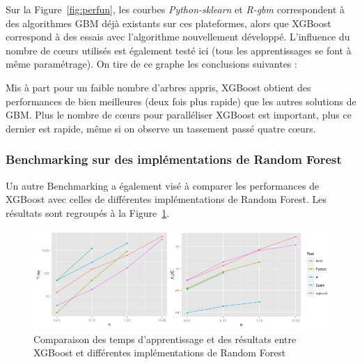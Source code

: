 Sur la Figure~\ref{fig:perfun}, les courbes \textit{Python-sklearn} et \textit{R-gbm} correspondent à des algorithmes GBM déjà existants sur ces plateformes, alors que XGBoost correspond à des essais avec l'algorithme nouvellement développé. L'influence du nombre de c\oe urs utilisés est également testé ici (tous les apprentissages se font à même paramétrage). On tire de ce graphe les conclusions suivantes :\begin{itemize}
Mis à part pour un faible nombre d'arbres appris, XGBoost obtient des performances de bien meilleures (deux fois plus rapide) que les autres solutions de GBM.
Plus le nombre de c\oe urs pour paralléliser XGBoost est important, plus ce dernier est rapide, même si on observe un tassement passé quatre c\oe urs.
\end{itemize}

\subsubsection{Benchmarking sur des implémentations de Random Forest}
Un autre Benchmarking a également visé à comparer les performances de XGBoost avec celles de différentes implémentations de Random Forest. Les résultats sont regroupés à la Figure~\ref{fig:perfdeux}.

\begin{figure}[h]
	\begin{margincap}
		\centering
		\includegraphics[width=\textwidth]{images/More/perf_deux}
		\caption{Comparaison des temps d'apprentissage et des résultats entre XGBoost et différentes implémentations de Random Forest \cite{bib:benchmarkin-rf}}
		\label{fig:perfdeux}
	\end{margincap}
\end{figure}


